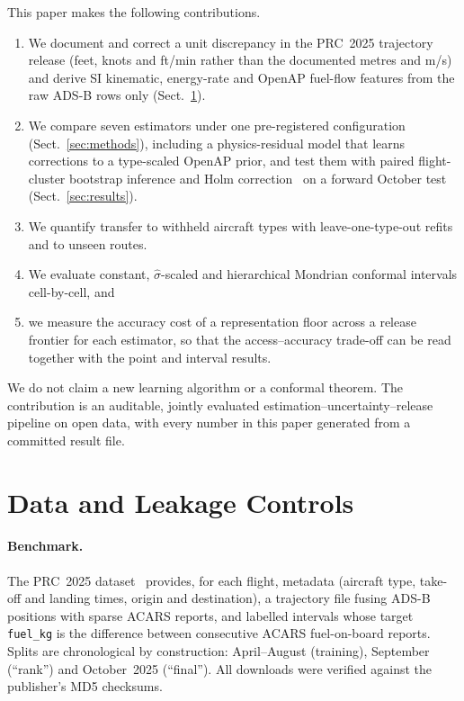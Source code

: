 \documentclass[runningheads]{llncs}
\begin{document}
This paper makes the following contributions.
\begin{enumerate}
  \item We document and correct a unit discrepancy in the PRC~2025 trajectory release (feet, knots and ft/min rather than the documented metres and m/s) and derive SI kinematic, energy-rate and OpenAP fuel-flow features from the raw ADS-B rows only (Sect.~\ref{sec:data}).
  \item We compare seven estimators under one pre-registered configuration (Sect.~\ref{sec:methods}), including a physics-residual model that learns corrections to a type-scaled OpenAP prior, and test them with paired flight-cluster bootstrap inference and Holm correction~\cite{holm1979} on a forward October test (Sect.~\ref{sec:results}).
  \item We quantify transfer to withheld aircraft types with leave-one-type-out refits and to unseen routes.
  \item We evaluate constant, $\hat\sigma$-scaled and hierarchical Mondrian conformal intervals cell-by-cell, and
  \item we measure the accuracy cost of a representation floor across a release frontier for each estimator, so that the access--accuracy trade-off can be read together with the point and interval results.
\end{enumerate}
We do not claim a new learning algorithm or a conformal theorem. The contribution is an auditable, jointly evaluated estimation--uncertainty--release pipeline on open data, with every number in this paper generated from a committed result file.

\section{Data and Leakage Controls}\label{sec:data}
\paragraph{Benchmark.}
The PRC~2025 dataset~\cite{zenodo_prc2025} provides, for each flight, metadata (aircraft type, take-off and landing times, origin and destination), a trajectory file fusing ADS-B positions with sparse ACARS reports, and labelled intervals whose target \texttt{fuel\_kg} is the difference between consecutive ACARS fuel-on-board reports. Splits are chronological by construction: April--August (training), September (``rank'') and October~2025 (``final''). All downloads were verified against the publisher's MD5 checksums.
\end{document}
